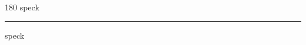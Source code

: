 
\begin{frame}
\begin{center}
\begin{turn}{180}
{\fontsize{2.5cm}{1em}\selectfont speck}
\end{turn}
\vspace{1em}\par  
\hrule
\vspace{1em}\par  
{\fontsize{2.5cm}{1em}\selectfont speck}
\end{center}
\end{frame}
